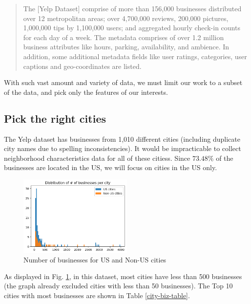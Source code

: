 \documentclass[draftclsnofoot]{IEEEtran}
\let\MYoriglatexcaption\caption
\renewcommand{\caption}[2][\relax]{\MYoriglatexcaption[#2]{#2}}
\begin{document}
\begin{quote}
The [Yelp Dataset] comprise of more than 156,000 businesses distributed over 12 metropolitan areas; over 4,700,000 reviews, 200,000 pictures, 1,000,000 tips by 1,100,000 users; and aggregated hourly check-in counts for each day of a week. The metadata comprises of over 1.2 million business attributes like hours, parking, availability, and ambience. In addition, some additional metadata fields like user ratings, categories, user captions and geo-coordinates are listed.
\end{quote}

With such vast amount and variety of data, we must limit our work to a subset of the data, and pick only the features of our interests.

\subsection{Pick the right cities}

The Yelp dataset has businesses from 1,010 different cities (including duplicate city names due to spelling inconsistencies). It would be impracticable to collect neighborhood characteristics data for all of these citiess. Since $73.48\%$ of the businesses are located in the US, we will focus on cities in the US only.

\begin{figure}[h]
  \hspace{-.5em}
    \includegraphics[width=0.5\textwidth]{hist-city-biz}
  \caption{Number of businesses for US and Non-US cities}
  \label{city-biz}
\end{figure}

As displayed in Fig. \ref{city-biz}, in this dataset, most cities have less than 500 businesses (the graph already excluded cities with less than 50 businesses). The Top 10 cities with most businesses are shown in Table \ref{city-biz-table}.
\end{document}
